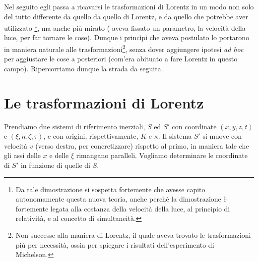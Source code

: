 Nel seguito egli passa a ricavarsi le trasformazioni di Lorentz in un
modo non solo del tutto differente da quello da quello di Lorentz, e da
quello che potrebbe aver utilizzato \poin\footnote{Da tale dimostrazione
si sospetta fortemente che \ein{} avesse capito autonomamente questa
nuova teoria, anche perch\'e la dimostrazione \`e fortemente legata alla
costanza della velocit\`a della luce, al principio di relativit\`a, e al
concetto di simultaneit\`a.}, ma anche pi\`u mirato (\poin{} aveva
fissato un parametro, la velocit\`a della luce, per far tornare le
cose). Dunque i princ\`ipi che aveva postulato lo
portarono in maniera naturale alle trasformazioni\footnote{Non successe
alla maniera di Lorentz, il quale aveva trovato le trasformazioni pi\`u
per necessit\`a, ossia per spiegare i risultati dell'esperimento di
Michelson.}, senza dover aggiungere ipotesi \emph{ad hoc} per aggiustare
le cose a posteriori (com'era abituato a fare Lorentz in questo
campo). Ripercorriamo dunque la strada da \ein {} seguita.

\section{Le trasformazioni di Lorentz}
Prendiamo due sistemi di riferimento inerziali, $S$ ed $S'$ con
coordinate $(x,y,z,t)$ e $(\xi,\eta,\zeta,\tau)$, e con origini,
rispettivamente, $K$ e $\kappa$. Il sistema $S'$ si muove con velocit\`a
$v$ (verso destra, per concretizzare) rispetto al primo, in maniera
tale che gli assi delle $x$ e delle $\xi$ rimangano
paralleli. Vogliamo determinare le coordinate di $S'$ in funzione di
quelle di $S$.

